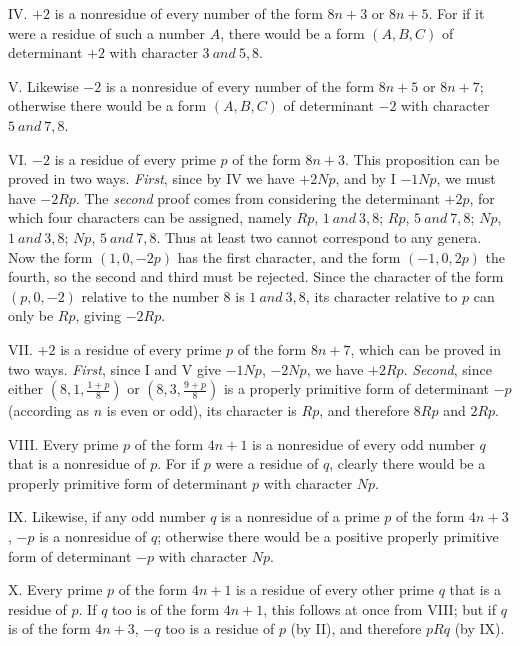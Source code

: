 IV. $+2$ is a nonresidue of every number of the form $8n+3$ or $8n+5$. For if it were a residue of such a number $A$, there would be a form $(A,B,C)$ of determinant $+2$ with character $3\ \mathit{and}\ 5,8$.

V. Likewise $-2$ is a nonresidue of every number of the form $8n+5$ or $8n+7$; otherwise there would be a form $(A,B,C)$ of determinant $-2$ with character $5\ \mathit{and}\ 7,8$.

VI. $-2$ is a residue of every prime $p$ of the form $8n+3$. This proposition can be proved in two ways. \textit{First}, since by IV we have $+2Np$, and by I $-1Np$, we must have $-2Rp$. The \textit{second} proof comes from considering the determinant $+2p$, for which four characters can be assigned, namely $Rp$, $1\ \mathit{and}\ 3,8$; $Rp$, $5\ \mathit{and}\ 7,8$; $Np$, $1\ \mathit{and}\ 3,8$; $Np$, $5\ \mathit{and}\ 7,8$. Thus at least two cannot correspond to any genera. Now the form
$(1,0,-2p)$ has the first character, and the form $(-1,0,2p)$ the fourth, so the second and third must be rejected. Since the character of the form $(p,0,-2)$ relative to the number $8$ is $1\ \mathit{and}\ 3,8$, its character relative to $p$ can only be $Rp$, giving $-2Rp$.

VII. $+2$ is a residue of every prime $p$ of the form $8n+7$, which can be proved in two ways. \textit{First}, since I and V give $-1Np$, $-2Np$, we have $+2Rp$. \textit{Second}, since either $\left(8,\allowbreak 1,\allowbreak \frac{1+p}{8}\right)$ or $\left(8,\allowbreak 3,\allowbreak \frac{9+p}{8}\right)$ is a properly primitive form of determinant $-p$ (according as $n$ is even or odd), its character is $Rp$, and therefore $8Rp$ and $2Rp$.

VIII. Every prime $p$ of the form $4n+1$ is a nonresidue of every odd number $q$ that is a nonresidue of $p$. For if $p$ were a residue of $q$, clearly there would be a properly primitive form of determinant $p$ with character $Np$.

IX. Likewise, if any odd number $q$ is a nonresidue of a prime $p$ of the form $4n+3$, $-p$ is a nonresidue of $q$; otherwise there would be a positive properly primitive form of determinant $-p$ with character $Np$.

X. Every prime $p$ of the form $4n+1$ is a residue of every other prime $q$ that is a residue of $p$. If $q$ too is of the form $4n+1$, this follows at once from VIII; but if $q$ is of the form $4n+3$, $-q$ too is a residue of $p$ (by II), and therefore $pRq$ (by IX).


